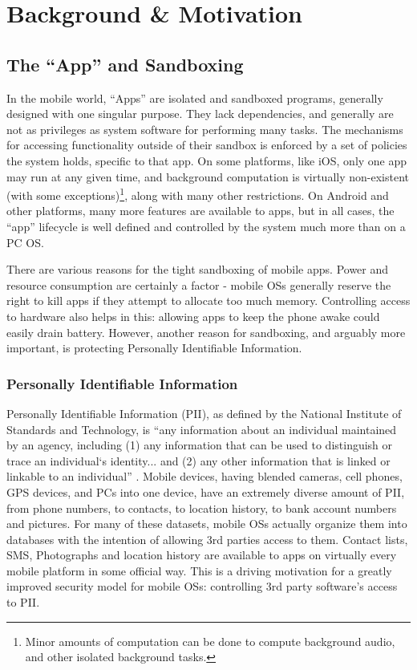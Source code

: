 \chapter{Background \& Motivation}
\label{sec:background}


\section{The ``App'' and Sandboxing}

In the mobile world, ``Apps'' are isolated and sandboxed programs, generally designed with one singular purpose. They lack dependencies, and generally are not as privileges as system software for performing many tasks. The mechanisms for accessing functionality outside of their sandbox is enforced by a set of policies the system holds, specific to that app. On some platforms, like iOS, only one app may run at any given time, and background computation is virtually non-existent (with some exceptions)\footnote{Minor amounts of computation can be done to compute background audio, and other isolated background tasks.}, along with many other restrictions. On Android and other platforms, many more features are available to apps, but in all cases, the ``app'' lifecycle is well defined and controlled by the system much more than on a PC OS.

There are various reasons for the tight sandboxing of mobile apps. Power and resource consumption are certainly a factor - mobile OSs generally reserve the right to kill apps if they attempt to allocate too much memory. Controlling access to hardware also helps in this: allowing apps to keep the phone awake could easily drain battery. However, another reason for sandboxing, and arguably more important, is protecting Personally Identifiable Information.

\subsection{Personally Identifiable Information}

Personally Identifiable Information (PII), as defined by the National Institute of Standards and Technology, is ``any information about an individual maintained by an agency, including (1) any information that can be used to distinguish or trace an individual‘s identity... and (2) any other information that is linked or linkable to an individual'' \citep{mccallister2010guide}. Mobile devices, having blended cameras, cell phones, GPS devices, and PCs into one device, have an extremely diverse amount of PII, from phone numbers, to contacts, to location history, to bank account numbers and pictures. For many of these datasets, mobile OSs actually organize them into databases with the intention of allowing 3rd parties access to them. Contact lists, SMS, Photographs and location history are available to apps on virtually every mobile platform in some official way. This is a driving motivation for a greatly improved security model for mobile OSs: controlling 3rd party software's access to PII. 


